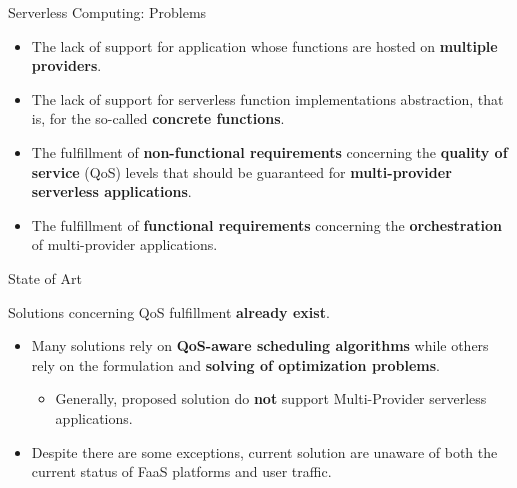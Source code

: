 \documentclass[13.5pt]{beamer}
\newcommand{\B}[1]{\textcolor{TorVergataColor}{\textbf{#1}}}
\begin{document}
\begin{frame}{Serverless Computing: Problems}
	
	\begin{itemize}
		\item The lack of support for application whose functions are hosted on \B{multiple providers}.
		\vspace{\baselineskip}
		\item The lack of support for serverless function implementations abstraction, that is, for the so-called \B{concrete functions}.
		\vspace{\baselineskip}
		\item The fulfillment of \B{non-functional requirements} concerning the \B{quality of service} (QoS) levels that should be guaranteed for \B{multi-provider serverless applications}.
		\vspace{\baselineskip}
		\item The fulfillment of \B{functional requirements} concerning the \B{orchestration} of multi-provider applications.
	\end{itemize}

\end{frame} 
\begin{frame}{State of Art}

Solutions concerning QoS fulfillment \B{already exist}.
\vspace{\baselineskip}
\begin{itemize}
	\item Many solutions rely on \B{QoS-aware scheduling algorithms} while others rely on the formulation and \B{solving of optimization problems}.
	
	\begin{itemize}
		\item Generally, proposed solution do \B{not} support Multi-Provider serverless applications. 
	\end{itemize}
	
	\vspace{\baselineskip}
	\item Despite there are some exceptions, current solution are unaware of both the current status of FaaS platforms and user traffic.
	\vspace{\baselineskip}
	
\end{itemize}

\end{frame} 

\end{document}
